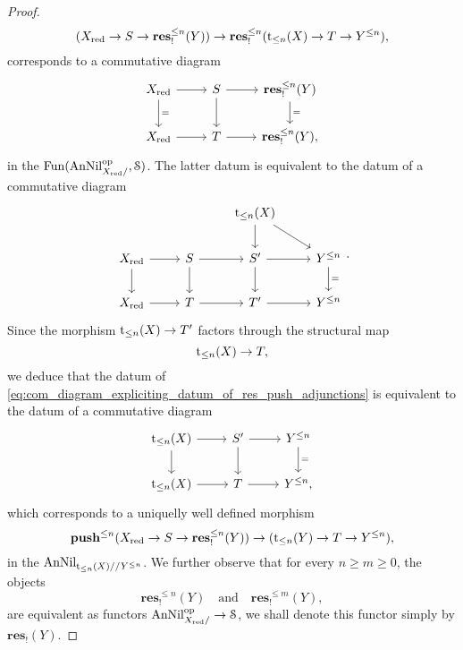 \documentclass[10pt,a4paper,reqno]{amsart} %
\theoremstyle{plain}
\theoremstyle{definition}
\theoremstyle{remark}
\numberwithin{equation}{section}
\begin{document}
\begin{proof}
        \[
            (X_{\mathrm{red}} \to S \to \mathbf{res}^{\le n}_!(Y)) \to \mathbf{res}_!^{\le n}(\mathrm t_{\le n}(X) \to T \to Y^{\le n}),  
        \]
    corresponds to a commutative diagram
        \[
        \begin{tikzcd}
            X_\red \ar{r} \ar{d}{=} & S \ar{r} \ar{d} & \mathbf{res}_!^{\le n}(Y) \ar{d}{=} \\
            X_\red \ar{r} & T \ar{r} & \mathbf{res}_!^{\le n}(Y),
        \end{tikzcd}
        \]
    in the \infcat $\operatorname{Fun}(\mathrm{AnNil}_{X_{\mathrm{red}}/ }^\mathrm{op}, \mathcal S)$. The latter datum is equivalent to the datum of a commutative diagram
        \begin{equation} \label{eq:com_diagram_expliciting_datum_of_res_push_adjunctions}
        \begin{tikzcd}
                                 &                 & \rt_{\le n}(X) \ar{d}   \ar{rd}    &   \\
            X_\red \ar{r} \ar{d} & S \ar{r} \ar{d} & S' \ar{r} \ar{d}                   & Y^{\le n} \ar{d}{=} \\
            X_\red \ar{r}        & T \ar{r}        & T' \ar{r}                          & Y^{\le n}  
        \end{tikzcd}.
        \end{equation}
    Since the morphism $\mathrm t_{\le n}(X) \to T'$ factors through the structural map
        \[
            \mathrm t_{\le n}(X) \to T,  
        \]
    we deduce that the datum of \eqref{eq:com_diagram_expliciting_datum_of_res_push_adjunctions} is equivalent to the datum of a commutative diagram
        \[
        \begin{tikzcd}
            \rt_{\le n}(X) \ar{r} \ar{d} & S' \ar{r} \ar{d} & Y^{\le n} \ar{d}{=} \\
            \rt_{\le n}(X) \ar{r}        & T \ar{r}        & Y^{\le n}, 
        \end{tikzcd}
        \]
    which corresponds to a uniquelly well defined morphism
        \[
            \mathbf{push}^{\le n}(X_{\mathrm{red}} \to S \to \mathbf{res}^{\le n}_!(Y)) \to (\mathrm t_{\le n}(Y) \to T \to Y^{\le n}),
        \]
    in the \infcat $\mathrm{AnNil}_{\mathrm t_{\le n}(X)/ /Y^{\le n}}$. We further observe that for every $n \ge m \ge 0$, the objects
        \[
            \mathbf{res}^{\le n}_!(Y) \quad \mathrm{and} \quad \mathbf{res}^{\le m}_!(Y),  
        \]
    are equivalent as functors $\mathrm{AnNil}_{X_{\mathrm{red}}/ } ^\mathrm{op} \to \mathcal S$, we shall denote this functor simply by $\mathbf{res}_!(Y)$.
    

\end{proof}
\end{document}
